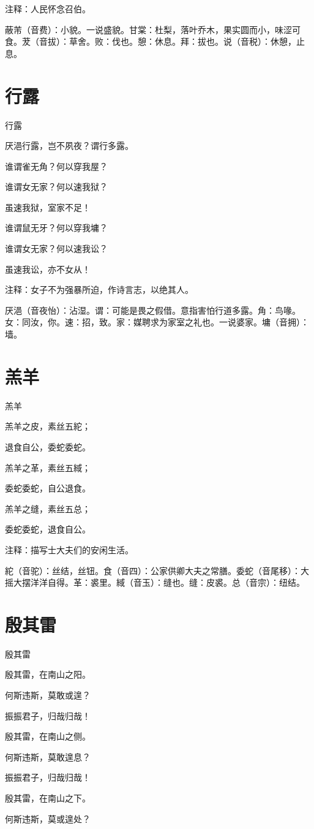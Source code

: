\documentclass[12pt,UTF8]{ctexbook}
\begin{document}
注释：人民怀念召伯。

蔽芾（音费）：小貌。一说盛貌。甘棠：杜梨，落叶乔木，果实圆而小，味涩可食。茇（音拔）：草舍。败：伐也。憩：休息。拜：拔也。说（音税）：休憩，止息。
\chapter{行露}
行露

厌浥行露，岂不夙夜？谓行多露。

谁谓雀无角？何以穿我屋？

谁谓女无家？何以速我狱？

虽速我狱，室家不足！

谁谓鼠无牙？何以穿我墉？

谁谓女无家？何以速我讼？

虽速我讼，亦不女从！

注释：女子不为强暴所迫，作诗言志，以绝其人。

厌浥（音夜怡）：沾湿。谓：可能是畏之假借。意指害怕行道多露。角：鸟喙。女：同汝，你。速：招，致。家：媒聘求为家室之礼也。一说婆家。墉（音拥）：墙。
\chapter{羔羊}
羔羊

羔羊之皮，素丝五紽；

退食自公，委蛇委蛇。

羔羊之革，素丝五緎；

委蛇委蛇，自公退食。

羔羊之缝，素丝五总；

委蛇委蛇，退食自公。

注释：描写士大夫们的安闲生活。

紽（音驼）：丝结，丝钮。食（音四）：公家供卿大夫之常膳。委蛇（音尾移）：大摇大摆洋洋自得。革：裘里。緎（音玉）：缝也。缝：皮裘。总（音宗）：纽结。
\chapter{殷其雷}
殷其雷

殷其雷，在南山之阳。

何斯违斯，莫敢或遑？

振振君子，归哉归哉！

殷其雷，在南山之侧。

何斯违斯，莫敢遑息？

振振君子，归哉归哉！

殷其雷，在南山之下。

何斯违斯，莫或遑处？
\end{document}
